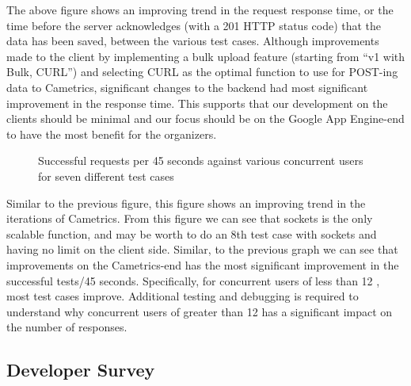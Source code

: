 \documentclass[10pt,a4paper,english]{article}
\begin{document}
The above figure shows an improving trend in the request response time, or the time before the server acknowledges (with a 201 HTTP status code) that the data has been saved, between the various test cases. Although improvements made to the client by implementing a bulk upload feature (starting from ``v1 with Bulk, CURL'') and selecting CURL as the optimal function to use for POST-ing data to Cametrics, significant changes to the backend had most significant improvement in the response time. This supports that our development on the clients should be minimal and our focus should be on the Google App Engine-end to have the most benefit for the organizers.
\begin{figure}[htbp]
\centering

\caption{Successful requests per 45 seconds against various concurrent users for seven different test cases}\end{figure}

Similar to the previous figure, this figure shows an improving trend in the iterations of Cametrics. From this figure we can see that sockets is the only scalable function, and may be worth to do an 8th test case with sockets and having no limit on the client side. Similar, to the previous graph we can see that improvements on the Cametrics-end has the most significant improvement in the successful tests/45 seconds. Specifically, for concurrent users of less than 12 , most test cases improve. Additional testing and debugging is required to understand why concurrent users of greater than 12 has a significant impact on the number of responses.



\hypertarget{developer-survey}{}
\subsection*{Developer Survey}
\label{developer-survey}
\end{document}
